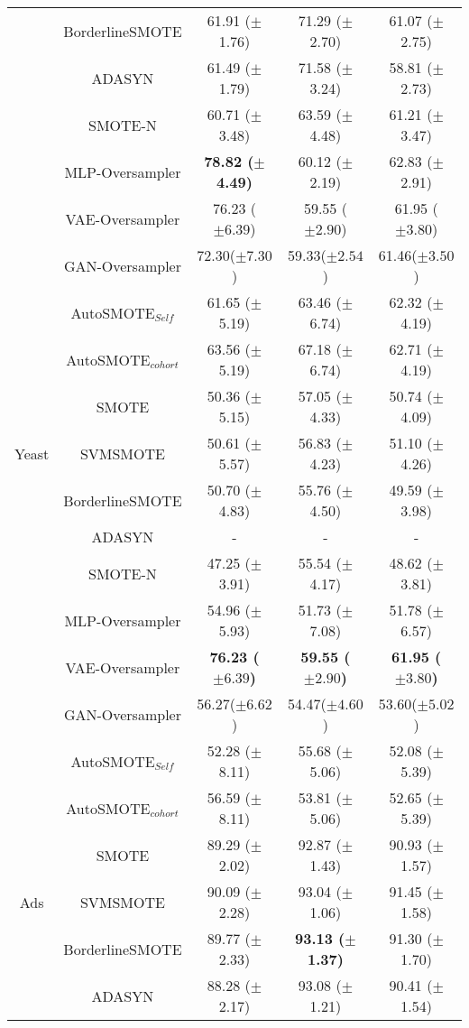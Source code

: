 \begin{longtable}{cc|ccc}
  & BorderlineSMOTE &61.91 ($\pm$1.76)&71.29 ($\pm$2.70)&61.07 ($\pm$2.75) \\
  & ADASYN &61.49 ($\pm$1.79)&71.58 ($\pm$3.24)&58.81 ($\pm$2.73)  \\
  & SMOTE-N & 60.71 ($\pm$3.48)&63.59 ($\pm$4.48)&61.21 ($\pm$3.47) \\
  & MLP-Oversampler &\textbf{78.82 ($\pm$4.49)}&60.12 ($\pm$2.19)&62.83 ($\pm$2.91)\\
  & VAE-Oversampler & 76.23 ($\pm6.39$)&59.55 ($\pm2.90$)& 61.95 ($\pm3.80$) \\
  & GAN-Oversampler & 72.30($\pm7.30$)&59.33($\pm2.54$)& 61.46($\pm3.50$) \\
  & AutoSMOTE$_{Self}$ & 61.65 ($\pm$5.19)&63.46 ($\pm$6.74)&62.32 ($\pm$4.19) \\
  & AutoSMOTE$_{cohort}$ & 63.56 ($\pm$5.19)&67.18 ($\pm$6.74)&62.71 ($\pm$4.19)\\
\midrule
\multirow{3}{*}{Yeast}
  & SMOTE & 50.36 ($\pm$5.15)&57.05 ($\pm$4.33)&50.74 ($\pm$4.09)  \\
  & SVMSMOTE &50.61 ($\pm$5.57)&56.83 ($\pm$4.23)&51.10 ($\pm$4.26)  \\
  & BorderlineSMOTE &50.70 ($\pm$4.83)&55.76 ($\pm$4.50)&49.59 ($\pm$3.98) \\
  & ADASYN & -& -& -  \\
  & SMOTE-N &47.25 ($\pm$3.91)&55.54 ($\pm$4.17)&48.62 ($\pm$3.81) \\
  & MLP-Oversampler &54.96 ($\pm$5.93)&51.73 ($\pm$7.08)&51.78 ($\pm$6.57) \\
  & VAE-Oversampler & \textbf{76.23 ($\pm6.39$)}& \textbf{59.55 ($\pm2.90$)}& \textbf{61.95 ($\pm3.80$)} \\
  & GAN-Oversampler & 56.27($\pm6.62$)&54.47($\pm4.60$)& 53.60($\pm5.02$) \\
  & AutoSMOTE$_{Self}$ &52.28 ($\pm$8.11)&55.68 ($\pm$5.06)&52.08 ($\pm$5.39) \\
  & AutoSMOTE$_{cohort}$ &56.59 ($\pm$8.11)&53.81 ($\pm$5.06)&52.65 ($\pm$5.39)\\
\midrule
\multirow{3}{*}{Ads}
  & SMOTE & 89.29 ($\pm$2.02)&92.87 ($\pm$1.43)&90.93 ($\pm$1.57)  \\
  & SVMSMOTE & 90.09 ($\pm$2.28)&93.04 ($\pm$1.06)&91.45 ($\pm$1.58) \\
  & BorderlineSMOTE &89.77 ($\pm$2.33)&\textbf{93.13 ($\pm$1.37)}&91.30 ($\pm$1.70)\\
  & ADASYN &88.28 ($\pm$2.17)&93.08 ($\pm$1.21)&90.41 ($\pm$1.54)\\

\end{longtable}
